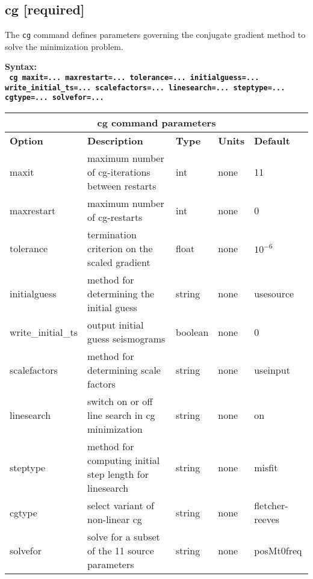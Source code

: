 \documentclass[11pt]{report}
\begin{document}
\subsection{cg [required]}
The \verb+cg+ command defines parameters governing the conjugate gradient method
to solve the minimization problem.
\begin{flushleft}
\bf
Syntax:\\
\tt
cg maxit=... maxrestart=... tolerance=... initialguess=... write\_initial\_ts=... scalefactors=... linesearch=... steptype=... cgtype=... solvefor=...
\\
\end{flushleft}
%
\begin{center}
\begin{tabular}{|l|p{8cm}|l|l|l|} \hline
\multicolumn{5}{|c|}{\bf cg command parameters }\\ \hline
\bf{Option} & \bf{Description} & \bf{Type} & \bf{Units} & \bf{Default} \\ \hline \hline
maxit & maximum number of cg-iterations between restarts & int & none & 11 \\ \hline
maxrestart & maximum number of cg-restarts & int & none & 0 \\ \hline
tolerance & termination criterion on the scaled gradient & float & none & $10^{-6}$ \\ \hline
initialguess & method for determining the initial guess & string & none & usesource \\ \hline
write\_initial\_ts & output initial guess seismograms & boolean & none & 0 \\ \hline
scalefactors & method for determining scale factors & string & none & useinput \\ \hline
linesearch & switch on or off line search in cg minimization & string & none & on \\ \hline
steptype & method for computing initial step length for linesearch & string & none & misfit \\ \hline
cgtype & select variant of non-linear cg & string & none & fletcher-reeves \\ \hline
solvefor & solve for a subset of the 11 source parameters & string & none & posMt0freq \\ \hline
\end{tabular}
\end{center}
\end{document}
